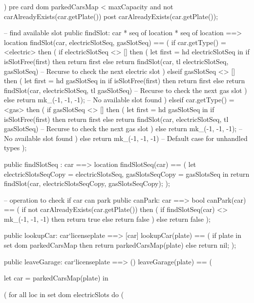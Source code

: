 \documentclass[a4paper]{article}
\begin{document}
\begin{vdm_al}
)
pre card dom parkedCarsMap < maxCapacity and not carAlreadyExists(car.getPlate())
post carAlreadyExists(car.getPlate());


-- find available slot
public findSlot: car * seq of location * seq of location ==> location
findSlot(car, electricSlotSeq, gasSlotSeq) ==
(
    if car.getType() = <electric> then
    (
        if electricSlotSeq <> [] then
        (
            let first = hd electricSlotSeq in
            if isSlotFree(first) then
                return first
            else
                return findSlot(car, tl electricSlotSeq, gasSlotSeq)  -- Recurse to check the next electric slot
        )
        elseif gasSlotSeq <> [] then
        (
            let first = hd gasSlotSeq in
            if isSlotFree(first) then
                return first
            else
                return findSlot(car, electricSlotSeq, tl gasSlotSeq)  -- Recurse to check the next gas slot
        )
        else
            return mk_(-1, -1, -1);  -- No available slot found
    )
    elseif car.getType() = <gas> then
    (
        if gasSlotSeq <> [] then
        (
            let first = hd gasSlotSeq in
            if isSlotFree(first) then
                return first
            else
                return findSlot(car, electricSlotSeq, tl gasSlotSeq)  -- Recurse to check the next gas slot
        )
        else
            return mk_(-1, -1, -1);  -- No available slot found
    )
    else
        return mk_(-1, -1, -1)  -- Default case for unhandled types
);


public findSlotSeq : car ==> location
findSlotSeq(car) ==
(
    let electricSlotsSeqCopy = electricSlotsSeq, gasSlotsSeqCopy = gasSlotsSeq in
    return findSlot(car, electricSlotsSeqCopy, gasSlotsSeqCopy);
);

-- operation to check if car can park
public canPark: car ==> bool
canPark(car) ==
(
    if not carAlreadyExists(car.getPlate()) then
    (
        if findSlotSeq(car) <> mk_(-1, -1, -1) then
            return true
        else
            return false
    )
    else
        return false
);

public lookupCar: car`licenseplate ==> [car]
lookupCar(plate) ==
(
    if plate in set dom parkedCarsMap then
        return parkedCarsMap(plate)
    else
        return nil;
);

public leaveGarage: car`licenseplate ==> ()
leaveGarage(plate) ==
(
        
        let car = parkedCarsMap(plate) in
        
        (
            for all loc in set dom electricSlots do
            (   
                

\end{vdm_al}
\end{document}
